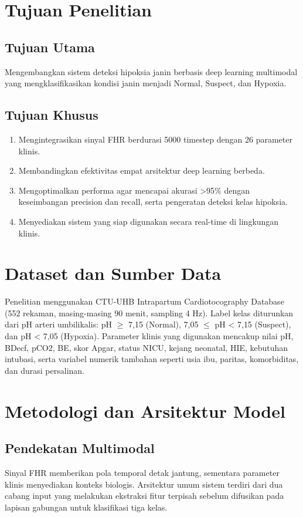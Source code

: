 \documentclass[11pt,a4paper]{article}
\begin{document}
\section{Tujuan Penelitian}
\subsection{Tujuan Utama}
Mengembangkan sistem deteksi hipoksia janin berbasis deep learning multimodal yang mengklasifikasikan kondisi janin menjadi Normal, Suspect, dan Hypoxia.
\subsection{Tujuan Khusus}
\begin{enumerate}[leftmargin=*]
    \item Mengintegrasikan sinyal FHR berdurasi 5000 timestep dengan 26 parameter klinis.
    \item Membandingkan efektivitas empat arsitektur deep learning berbeda.
    \item Mengoptimalkan performa agar mencapai akurasi \textgreater{}95\% dengan keseimbangan precision dan recall, serta pengeratan deteksi kelas hipoksia.
    \item Menyediakan sistem yang siap digunakan secara real-time di lingkungan klinis.
\end{enumerate}

\section{Dataset dan Sumber Data}
Penelitian menggunakan CTU-UHB Intrapartum Cardiotocography Database (552 rekaman, masing-masing 90 menit, sampling 4 Hz). Label kelas diturunkan dari pH arteri umbilikalis: pH \ensuremath{\geq} 7{,}15 (Normal), 7{,}05 \ensuremath{\leq} pH \textless{} 7{,}15 (Suspect), dan pH \textless{} 7{,}05 (Hypoxia). Parameter klinis yang digunakan mencakup nilai pH, BDecf, pCO2, BE, skor Apgar, status NICU, kejang neonatal, HIE, kebutuhan intubasi, serta variabel numerik tambahan seperti usia ibu, paritas, komorbiditas, dan durasi persalinan.

\section{Metodologi dan Arsitektur Model}
\subsection{Pendekatan Multimodal}
Sinyal FHR memberikan pola temporal detak jantung, sementara parameter klinis menyediakan konteks biologis. Arsitektur umum sistem terdiri dari dua cabang input yang melakukan ekstraksi fitur terpisah sebelum difusikan pada lapisan gabungan untuk klasifikasi tiga kelas.
\end{document}
